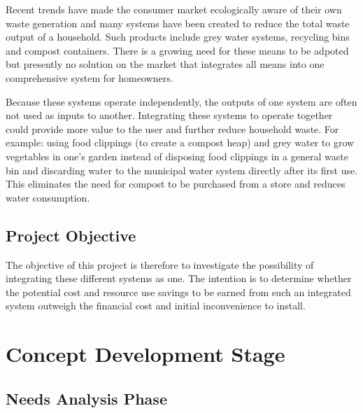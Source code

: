 \documentclass[a4paper,11pt,fleqn]{report}
\begin{document}
Recent trends have made the consumer market ecologically aware of their own waste generation and many systems have been created to reduce the total waste output of a household. Such products include grey water systems, recycling bins and compost containers. There is a growing need for these means to be adpoted but presently no solution on the market that integrates all means into one comprehensive system for homeowners.
  
Because these systems operate independently, the outputs of one system are often not used as inputs to another. Integrating these systems to operate together could provide more value to the user and further reduce household waste. For example: using food clippings (to create a compost heap) and grey water to grow vegetables in one's garden instead of disposing food clippings in a general waste bin and discarding water to the municipal water system directly after its first use. This eliminates the need for compost to be purchased from a store and reduces water consumption.

\section{Project Objective} \label{sec: Project Objective}
The objective of this project is therefore to investigate the possibility of integrating these different systems as one. The intention is to determine whether the potential cost and resource use savings to be earned from such an integrated system outweigh the financial cost and initial inconvenience to install.

\chapter{Concept Development Stage}
\section{Needs Analysis Phase} \label{sec: Needs Analysis Phase}
\end{document}
